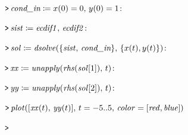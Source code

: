 \documentclass{article}
\begin{document}
\mapleinput
{$ \displaystyle \texttt{>\,} \textit{cond\_in} \coloneqq x (0)=0,\,y (0)=1\colon  $}

\mapleinput
{$ \displaystyle \texttt{>\,} \mathit{sist} \coloneqq \mathit{ecdif1} ,\,\mathit{ecdif2} \colon  $}

\mapleinput
{$ \displaystyle \texttt{>\,} \mathit{sol} \coloneqq \mathit{dsolve} (\{\mathit{sist} ,\,\textit{cond\_in} \},\,\{x (t),y (t)\})\colon  $}

\mapleinput
{$ \displaystyle \texttt{>\,} \mathit{xx} \coloneqq \mathit{unapply} (\mathit{rhs} (\mathit{sol} [1]),\,t)\colon  $}

\mapleinput
{$ \displaystyle \texttt{>\,} \mathit{yy} \coloneqq \mathit{unapply} (\mathit{rhs} (\mathit{sol} [2]),\,t)\colon  $}

\mapleinput
{$ \displaystyle \texttt{>\,} \mathit{plot} ([\mathit{xx} (t),\,\mathit{yy} (t)],\,t =-5..5,\,\mathit{color} =[\mathit{red} ,\mathit{blue}]) $}

{}
\mapleinput
{$ \displaystyle \texttt{>\,} \, $}
\end{document}
